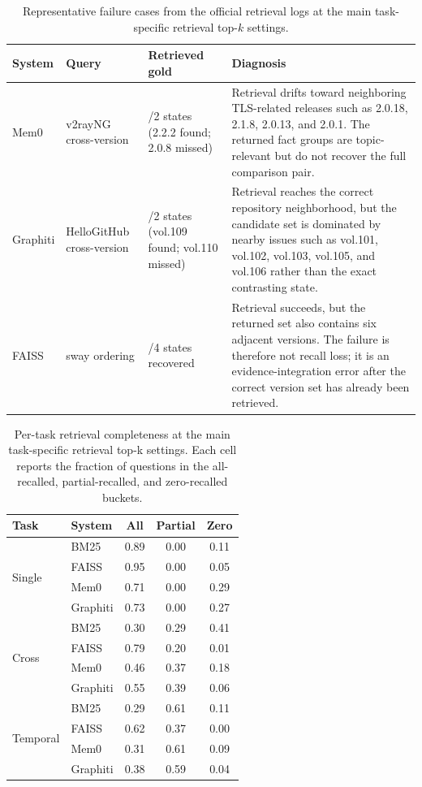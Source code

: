 \begin{table}[t]
\centering
\scriptsize
\caption{Representative failure cases from the official retrieval logs at the main task-specific retrieval top-$k$ settings.}
\label{tab:failure-cases}
\setlength{\tabcolsep}{2pt}
\begin{tabularx}{\columnwidth}{@{}>{\raggedright\arraybackslash}p{}>{\raggedright\arraybackslash}p{}>{\raggedright\arraybackslash}p{}>{\raggedright\arraybackslash}X@{}}
\toprule
System & Query & Retrieved gold & Diagnosis \\
\midrule
Mem0 & v2rayNG cross-version & 1/2 states (2.2.2 found; 2.0.8 missed) & Retrieval drifts toward neighboring TLS-related releases such as 2.0.18, 2.1.8, 2.0.13, and 2.0.1. The returned fact groups are topic-relevant but do not recover the full comparison pair. \\
Graphiti & HelloGitHub cross-version & 1/2 states (vol.109 found; vol.110 missed) & Retrieval reaches the correct repository neighborhood, but the candidate set is dominated by nearby issues such as vol.101, vol.102, vol.103, vol.105, and vol.106 rather than the exact contrasting state. \\
FAISS & sway ordering & 4/4 states recovered & Retrieval succeeds, but the returned set also contains six adjacent versions. The failure is therefore not recall loss; it is an evidence-integration error after the correct version set has already been retrieved. \\
\bottomrule
\end{tabularx}
\end{table}

\begin{table}[t]
\centering
\scriptsize
\caption{Per-task retrieval completeness at the main task-specific retrieval top-k settings. Each cell reports the fraction of questions in the all-recalled, partial-recalled, and zero-recalled buckets.}
\label{tab:per-task-decoupling-main}
\setlength{\tabcolsep}{3pt}
\begin{tabular}{llccc}
\toprule
Task & System & All & Partial & Zero \\
\midrule
\multirow{4}{*}{Single}
 & BM25 & 0.89 & 0.00 & 0.11 \\
 & FAISS & 0.95 & 0.00 & 0.05 \\
 & Mem0 & 0.71 & 0.00 & 0.29 \\
 & Graphiti & 0.73 & 0.00 & 0.27 \\
\midrule
\multirow{4}{*}{Cross}
 & BM25 & 0.30 & 0.29 & 0.41 \\
 & FAISS & 0.79 & 0.20 & 0.01 \\
 & Mem0 & 0.46 & 0.37 & 0.18 \\
 & Graphiti & 0.55 & 0.39 & 0.06 \\
\midrule
\multirow{4}{*}{Temporal}
 & BM25 & 0.29 & 0.61 & 0.11 \\
 & FAISS & 0.62 & 0.37 & 0.00 \\
 & Mem0 & 0.31 & 0.61 & 0.09 \\
 & Graphiti & 0.38 & 0.59 & 0.04 \\
\bottomrule
\end{tabular}
\end{table}

